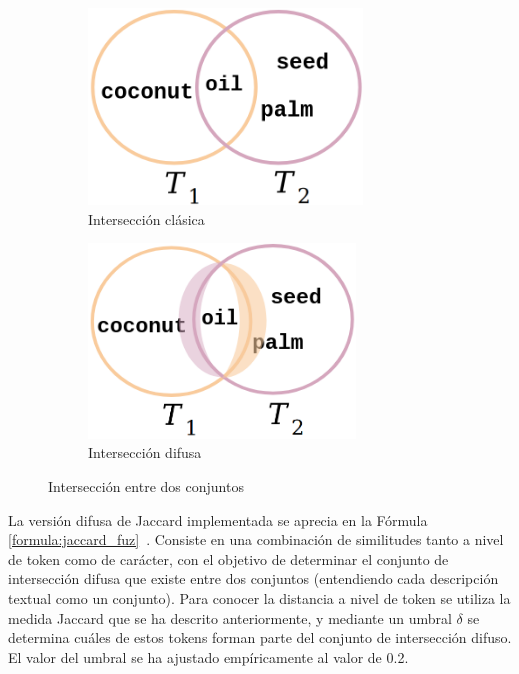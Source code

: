 \begin{figure}[h!]
    \begin{subfigure}[b]{0.47\textwidth}
        \centering
        \includegraphics[width=0.8\textwidth]{imagenes/img2.png}
        \caption{Intersección clásica}
    \end{subfigure}
    \begin{subfigure}[b]{0.47\textwidth}
        \centering
        \includegraphics[width=0.78\textwidth]{imagenes/img3.png}
        \caption{Intersección difusa}
    \end{subfigure}
    \caption{Intersección entre dos conjuntos}
    \label{fig:jaccard_difuso}
\end{figure}

La versión difusa de Jaccard implementada se aprecia en la Fórmula \ref{formula:jaccard_fuz}~\cite{wang2011fast}. Consiste en una combinación de similitudes tanto a nivel de token como de carácter, con el objetivo de determinar el conjunto de intersección difusa que existe entre dos conjuntos (entendiendo cada descripción textual como un conjunto). Para conocer la distancia a nivel de token se utiliza la medida Jaccard que se ha descrito anteriormente, y mediante un umbral $\delta$ se determina cuáles de estos tokens forman parte del conjunto de intersección difuso. El valor del umbral se ha ajustado empíricamente al valor de 0.2. 

